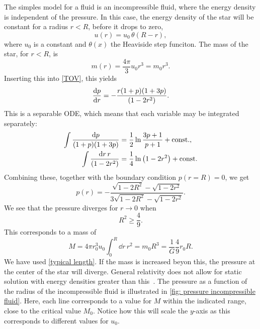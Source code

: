 The simples model for a fluid is an incompressible fluid, where the energy density is independent of the pressure.
In this case, the energy density of the star will be constant for a radius $r < R$, before it drops to zero,
%
\begin{equation}
    u(r) = u_0 \, \theta (R - r),
\end{equation}
%
where $u_0$ is a constant and $\theta(x)$ the Heaviside step funciton.
The mass of the star, for $r < R$, is
%
\begin{equation}
    m(r) = \frac{4 \pi }{3} u_0 r^3 = m_0 r^3 .
\end{equation}
%
Inserting this into \autoref{TOV}, this yields
%
\begin{equation} 
    \diff{p}{r} = - \frac{r (1 + p)(1 + 3 p)}{(1 - 2 r^2)}.
\end{equation}
%
This is a separable ODE, which means that each variable may be integrated separately:
%
\begin{align}
    \int \frac{\text{d} p}{(1 + p)(1 + 3p)} 
    & = \frac{1}{2} \ln \frac{3p + 1}{p + 1} + \mathrm{const.} , \\
    \int \frac{\text{d} r \, r}{(1 - 2 r^2)} 
    & = \frac{1}{4}\ln\left(1 - 2 r^2 \right) 
    + \mathrm{const.}
\end{align}
%
Combining these, together with the boundary condition $p(r = R) = 0$, we get
%
\begin{equation}
    p(r) 
    = 
    - \frac{\sqrt{1 - 2 R^2} - \sqrt{1 -2 r^2}}{3 \sqrt{1 - 2 R^2} - \sqrt{1 - 2 r^2} }.
\end{equation}
%
We see that the pressure diverges for $r\rightarrow 0$ when
%
\begin{equation}
    R^2 \geq \frac{4}{9}.
\end{equation}
This corresponds to a mass of
\begin{equation}
    M = 4 \pi r_0^3  u_0 \int_0^R \dd r \, r^2
    = m_0 R^3 = \frac{1}{G} \frac{4}{9} r_0 R .
\end{equation}
We have used \autoref{typical length}.
If the mass is increased beyon this, the pressure at the center of the star will diverge.
General relativity does not allow for static solution with energy densities greater than this~\autocite{carrollSpacetimeGeometryIntroduction2019}.
The pressure as a function of the radius of the incompressible fluid is illustrated in \autoref{fig: pressure incompressible fluid}.
Here, each line corresponds to a value for $M$ within the indicated range, close to the critical value $M_0$.
Notice how this will scale the $y$-axis as this corresponds to different values for $u_0$.

